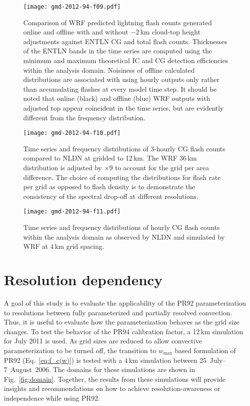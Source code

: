 \begin{figure*}[t]
\texttt{[image: gmd-2012-94-f09.pdf]}
\caption{Comparison of WRF predicted lightning flash counts generated online
and offline with and without $-2$\,\unit{km} cloud-top height adjustments
against ENTLN CG and total flash counts. Thicknesses of the ENTLN bands in
the time series are computed using the minimum and maximum theoretical IC and
CG detection efficiencies within the analysis domain. Noisiness of offline
calculated distributions are associated with using hourly outputs only rather
than accumulating flashes at every model time step. It should be noted that
online (black) and offline (blue) WRF outputs with adjusted top appear
coincident in the time series, but are evidently different from the frequency
distribution.}
      \label{fig:offcompare}
\end{figure*}

\begin{figure}[t]
      \texttt{[image: gmd-2012-94-f10.pdf]}
      \caption{Time series and frequency distributions of 3-hourly CG flash counts compared to NLDN at gridded to 12\,\unit{km}.
      The WRF 36\,\unit{km} distribution is adjusted by $\times9$ to account for the grid per area difference. The choice of
      computing the distributions for flash rate per grid as opposed to flash density is to demonstrate the consistency of
      the spectral drop-off at different resolutions.}
      \label{fig:gabiseries}
\end{figure}

\begin{figure}[t]
      \texttt{[image: gmd-2012-94-f11.pdf]}
      \caption{Time series and frequency distributions of hourly CG flash counts within
      the analysis domain as observed by NLDN and simulated by WRF at 4\,\unit{km} grid spacing.}
      \label{fig:4kmseries}
\end{figure}

\section{Resolution dependency}\label{sec:resolution}

A goal of this study is to evaluate the applicability of the PR92
parameterization to resolutions between fully parameterized and partially
resolved convection. Thus, it is useful to evaluate how the parameterization
behaves as the grid size changes. To test the behavior of the PR94
calibration factor, a 12\,\unit{km} simulation for July 2011 is used. As grid
sizes are reduced to allow convective parameterization to be turned off, the
transition to $w_{\max}$ based formulation of PR92 (Eq.~\ref{eq:f_c(w)}) is
tested with a 4\,\unit{km} simulation between 25~July--7~August~2006. The
domains for these simulations are shown in Fig.~\ref{fig:domain}. Together,
the results from these simulations will provide insights and recommendations
on how to achieve resolution-awareness or independence while using PR92.

